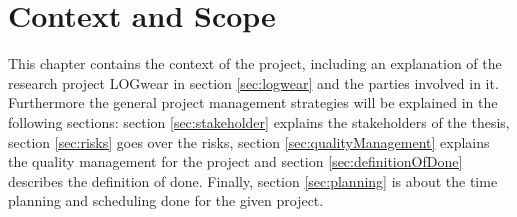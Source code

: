 \chapter{Context and Scope}\label{cha:context}
This chapter contains the context of the project, including an explanation of the research project LOGwear in section \ref{sec:logwear} and the parties involved in it. Furthermore the general project management strategies will be explained in the following sections: section \ref{sec:stakeholder} explains the stakeholders of the thesis, section \ref{sec:risks} goes over the risks, section \ref{sec:qualityManagement} explains the quality management for the project and section \ref{sec:definitionOfDone} describes the definition of done. %
Finally, section \ref{sec:planning} is about the time planning and scheduling done for the given project.

%
%

